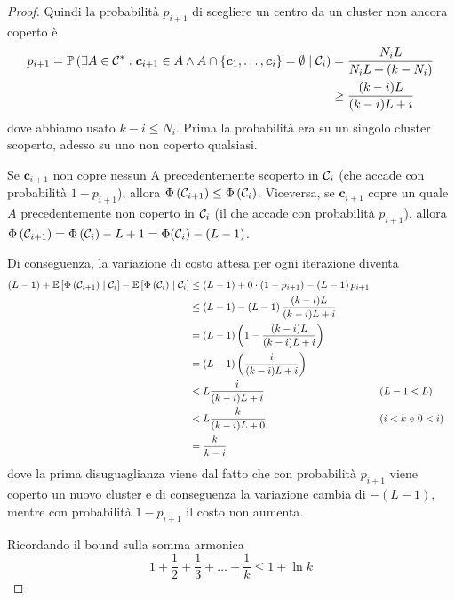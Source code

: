 \begin{proof}
    Quindi la probabilità $p_{i+1}$ di scegliere un centro da un cluster non ancora coperto è
    \begin{align*}
        p_{i+1} = \mathbb{P} \left(\exists A \in \mathcal{C}^\ast : \bm c_{i+1} \in A \wedge A \cap \left\{\bm c_1, \dots, \bm c_i\right\} = \emptyset \mid \mathcal{C}_i \right) & = \frac{N_i L}{N_i L + \left(k - N_i\right)} \\
        & \geq \frac{(k - i)L}{(k-i) L + i}
    \end{align*}
    dove abbiamo usato $k - i \leq N_i$. Prima la probabilità era su un singolo cluster scoperto, adesso su uno non coperto qualsiasi.

    Se $\bm c_{i+1}$ non copre nessun A precedentemente scoperto in $\mathcal{C}_i$ (che accade con probabilità $1 - p_{i+1}$), allora $\Phi \left(\mathcal{C}_{i+1}\right) \leq \Phi \left(\mathcal{C}_i\right)$. Viceversa, se $\bm c_{i+1}$ copre un quale $A$ precedentemente non coperto in $\mathcal{C}_i$ (il che accade con probabilità $p_{i+1}$), allora $\Phi \left(\mathcal{C}_{i+1}\right) = \Phi \left(\mathcal{C}_i\right) - L + 1 = \Phi (\mathcal{C}_i) - (L - 1)$.

    Di conseguenza, la variazione di costo attesa per ogni iterazione diventa
    \begin{align*}
        \left(L - 1\right) + \mathbb{E} \left[\Phi \left(\mathcal{C}_{i+1}\right) \mid \mathcal{C}_i \right] - \mathbb{E} \left[\Phi \left(\mathcal{C}_i\right) \mid \mathcal{C}_i \right] & \leq (L - 1) + 0 \cdot \left(1 - p_{i+1}\right) - \left(L - 1\right)p_{i+1} \\
        & \leq \left(L -1\right) - \left(L - 1\right) \frac{(k-i) L}{(k-i) L + i} \\
        & = \left(L - 1\right) \left(1 - \frac{(k - i) L}{(k - i) L + i} \right) \\
        & = \left(L - 1\right) \left(\frac{i}{(k-i)L + i}\right) \\
        & < L \frac{i}{(k-i) L + i} && (L - 1 < L)\\
        & < L \frac{k}{(k - i) L + 0} && (i < k \text{ e } 0 < i) \\
        & = \frac{k}{k-i}
    \end{align*}
    dove la prima disuguaglianza viene dal fatto che con probabilità $p_{i+1}$ viene coperto un nuovo cluster e di conseguenza la variazione cambia di $- (L - 1)$, mentre con probabilità $1 - p_{i+1}$ il costo non aumenta.

    Ricordando il bound sulla somma armonica
    \[ 1 + \frac{1}{2} + \frac{1}{3} + \dots + \frac{1}{k} \leq 1 + \ln k \tag*{$(\bullet)$} \]


\end{proof}
